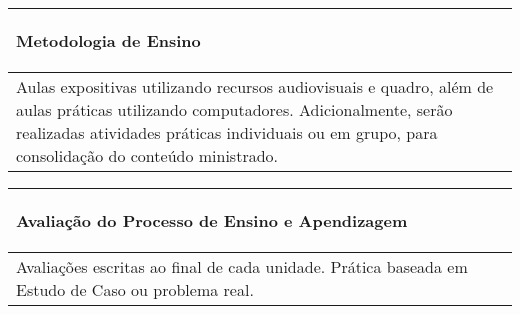 \begin{table}[h!]
\centering

\begin{small} 
  
\setlength{\tabcolsep}{3pt} 
\begin{tabular}{|p{15cm}|}\hline

\begin{center}\textbf{Metodologia de Ensino}\end{center}\\ \hline
   Aulas expositivas utilizando recursos audiovisuais e quadro, além de aulas práticas utilizando computadores. Adicionalmente, serão realizadas atividades práticas individuais ou em grupo, para consolidação do conteúdo ministrado.
 \\ \hline
\end{tabular} 
\end{small}
\label{dadosinstituicao}
\end{table}


\begin{table}[h!]
\centering

\begin{small} 
  
\setlength{\tabcolsep}{3pt} 
\begin{tabular}{|p{15cm}|}\hline

\begin{center}\textbf{Avaliação do Processo de Ensino e Apendizagem}\end{center}\\ \hline
   Avaliações escritas ao final de cada unidade. Prática baseada em Estudo de Caso ou problema real.
 \\ \hline
\end{tabular} 
\end{small}
\label{dadosinstituicao}
\end{table}

